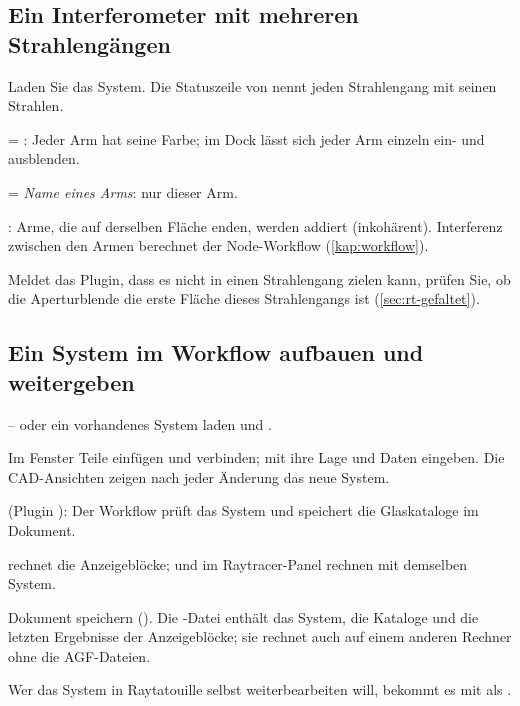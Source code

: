 \subsection{Ein Interferometer mit mehreren Strahlengängen}

\begin{schritte}
  \item Laden Sie das System. Die Statuszeile von  nennt jeden Strahlengang mit
    seinen Strahlen.
  \item {} = : Jeder Arm hat seine Farbe; im Dock  lässt
    sich jeder Arm einzeln ein- und ausblenden.
  \item {} = \textit{Name eines Arms}: nur dieser Arm.
  \item {}: Arme, die auf derselben Fläche enden, werden addiert (inkohärent).
    Interferenz zwischen den Armen berechnet der Node-Workflow (\autoref{kap:workflow}).
  \item Meldet das Plugin, dass es nicht in einen Strahlengang zielen kann, prüfen Sie, ob die
    Aperturblende die erste Fläche dieses Strahlengangs ist (\autoref{sec:rt-gefaltet}).
\end{schritte}

\subsection{Ein System im Workflow aufbauen und weitergeben}

\begin{schritte}
  \item {} -- oder ein vorhandenes System laden und .
  \item Im Fenster  Teile einfügen und verbinden; mit  ihre
    Lage und Daten eingeben. Die CAD-Ansichten zeigen nach jeder Änderung das neue System.
  \item {} (Plugin ): Der Workflow prüft das System und
    speichert die Glaskataloge im Dokument.
  \item {} rechnet die Anzeigeblöcke;  und 
    im Raytracer-Panel rechnen mit demselben System.
  \item Dokument speichern (). Die -Datei enthält das System, die
    Kataloge und die letzten Ergebnisse der Anzeigeblöcke; sie rechnet auch auf einem anderen
    Rechner ohne die AGF-Dateien.
  \item Wer das System in Raytatouille selbst weiterbearbeiten will, bekommt es mit
     als .
\end{schritte}

